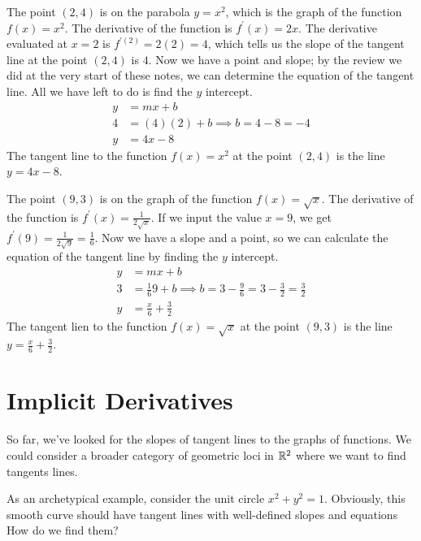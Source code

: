 \documentclass[fleqn]{report}
\begin{document}
\begin{example}
The point $(2,4)$ is on the parabola $y = x^2$, which is the
graph of the function $f(x) = x^2$. The derivative of the
function is $f^{\prime}(x) = 2x$. The derivative evaluated at
$x=2$ is $f^{\prime(2)} = 2(2) = 4$, which tells us the slope
of the tangent line at the point $(2,4)$ is $4$. Now we have a
point and slope; by the review we did at the very start of
these notes, we can determine the equation of the tangent
line. All we have left to do is find the $y$ intercept. 
\begin{align*}
y & = mx + b \\
4 & = (4)(2) + b \implies b = 4 - 8 = -4 \\
y & = 4x - 8 
\end{align*}
The tangent line to the function $f(x) = x^2$ at the point
$(2,4)$ is the line $y = 4x-8$. 
\end{example}

\begin{example}
The point $(9,3)$ is on the graph of the function $f(x) =
\sqrt{x}$. The derivative of the function is $f^{\prime}(x) =
\frac{1}{2\sqrt{x}}$. If we input the value $x=9$, we get
$f^{\prime}(9) = \frac{1}{2\sqrt{9}} = \frac{1}{6}$. Now we
have a slope and a point, so we can calculate the equation of
the tangent line by finding the $y$ intercept.
\begin{align*}
y & = mx + b \\
3 & = \frac{1}{6} 9 + b \implies b = 3 - \frac{9}{6} = 3 -
\frac{3}{2} = \frac{3}{2} \\
y & = \frac{x}{6} + \frac{3}{2}
\end{align*}
The tangent lien to the function $f(x) = \sqrt{x}$ at the
point $(9,3)$ is the line $y = \frac{x}{6} + \frac{3}{2}$. 
\end{example}

\section*{Implicit Derivatives}

So far, we've looked for the slopes of tangent lines to the
graphs of functions. We could  consider a broader category of
geometric loci in $\mathbb{R}^2$ where we want to find  tangents
lines.

As an archetypical example, consider the unit circle $x^2 +
y^2 =1$. Obviously, this smooth curve should have tangent
lines with well-defined slopes and equations How do we find
them?
\end{document}
